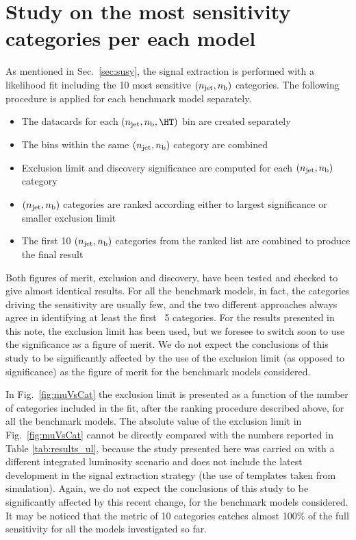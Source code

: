 \section{Study on the most sensitivity categories per each model}
\label{sec:sensitivity-study}
As mentioned in Sec.~\ref{sec:susy}, the signal extraction is performed with a likelihood fit including the 
10 most sensitive $(n_{\text{jet}},n_{\text{b}})$ categories. 
The following procedure is applied for each benchmark model separately.

\begin{itemize}
\item The datacards for each $(\njet,\nb,\HT)$ bin are created separately
\item The \HT bins within the same $(n_{\text{jet}},n_{\text{b}})$ category are combined
\item Exclusion limit and discovery significance are computed for each $(n_{\text{jet}},n_{\text{b}})$ category
\item $(n_{\text{jet}},n_{\text{b}})$ categories are ranked according either to largest significance or smaller exclusion limit
\item The first 10 $(n_{\text{jet}},n_{\text{b}})$ categories from the ranked list are combined to produce the final result
\end{itemize}

Both figures of merit, exclusion and discovery, have been tested and checked to give almost identical results. 
For all the benchmark models, in fact, the categories driving the sensitivity are usually few, 
and the two different approaches always agree in identifying at least the first ~5 categories. 
For the results presented in this note, the exclusion limit has been used, but we foresee to switch soon 
to use the significance as a figure of merit. 
We do not expect the conclusions of this study to be significantly
affected by the use of the exclusion limit (as opposed to
significance) as the figure of merit for the benchmark models
considered.

In Fig.~\ref{fig:muVsCat} the exclusion limit is presented as a function of the number of categories 
included in the fit, after the ranking procedure described above, for all the benchmark models. 
The absolute value of the exclusion limit in Fig.~\ref{fig:muVsCat} cannot be directly compared with the numbers reported in Table \ref{tab:results_ul}, 
because the study presented here was carried on with a different
integrated luminosity scenario and does not include the latest
development in the signal extraction strategy 
(\ie the use of \mht templates taken from simulation). Again, we do
not expect the conclusions of this study to be significantly affected
by this recent change, for the benchmark models considered. 
It may be noticed that the metric of 10 categories catches almost 100\% of the full sensitivity 
for all the models investigated so far.

